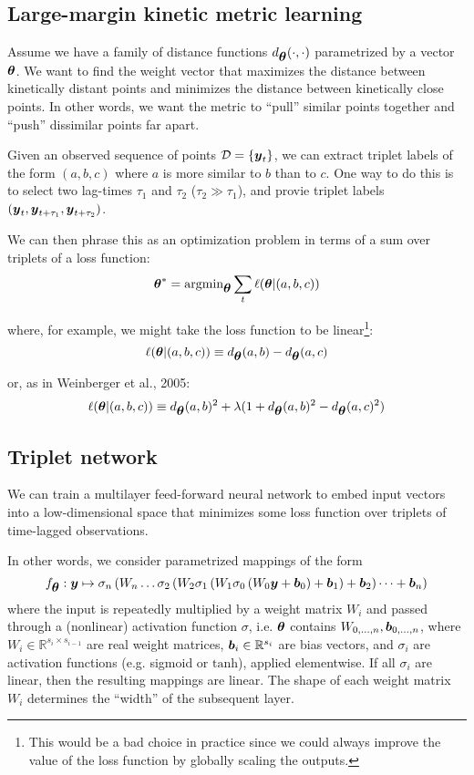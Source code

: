 \documentclass[aps,prl,preprint,nofootinbib,superscriptaddress,linenumbers]{revtex4-1}
\newcommand{\bfv}[1]{{\mbox{\boldmath{$#1$}}}}
\newcommand{\y}{\bfv{y}}
\newcommand{\params}{\bfv{\theta}}
\begin{document}
\subsection{Large-margin kinetic metric learning}
Assume we have a family of distance functions $d_\params(\cdot, \cdot)$ parametrized by a vector $\params$. We want to find the weight vector that maximizes the distance between kinetically distant points and minimizes the distance between kinetically close points. In other words, we want the metric to ``pull'' similar points together and ``push'' dissimilar points far apart.

Given an observed sequence of points $\mathcal{D} = \{\y_t\}$, we can extract triplet labels of the form $(a,b,c)$ where $a$ is more similar to $b$ than to $c$. One way to do this is to select two lag-times $\tau_1$ and $\tau_2$ ($\tau_2 \gg \tau_1$), and provie triplet labels $(\y_t,\y_{t+\tau_1},\y_{t+\tau_2})$.

We can then phrase this as an optimization problem in terms of a sum over triplets of a loss function:
\begin{equation} \label{eq:triplet_loss}
\params^* = \text{argmin}_\params \sum_{t} \ell(\params | (a,b,c))
\end{equation}

where, for example, we might take the loss function to be linear\footnote{This would be a bad choice in practice since we could always improve the value of the loss function by globally scaling the outputs.}:
$$
\ell(\params | (a,b,c)) \equiv d_\params(a,b)-d_\params(a,c)
$$

or, as in Weinberger et al., 2005:
$$\ell(\params | (a,b,c)) \equiv d_\params(a,b)^2 + \lambda (1 + d_\params(a,b)^2 - d_\params(a,c)^2)$$


\subsection{Triplet network}
We can train a multilayer feed-forward neural network to embed input vectors into a low-dimensional space that minimizes some loss function over triplets of time-lagged observations.

In other words, we consider parametrized mappings of the form
$$f_\params
:\y\mapsto
\sigma_n \left( W_n \dots \sigma_2 \left( W_2 \sigma_1 \left( W_1 \sigma_0 \left( W_0 \y  + \bfv{b}_0 \right)  + \bfv{b}_1 \right)  + \bfv{b}_2 \right) \dots + \bfv{b}_n \right)$$
where the input is repeatedly multiplied by a weight matrix $W_i$ and passed through a (nonlinear) activation function $\sigma$, i.e. $\params$ contains ${W_{0, \dots, n},\bfv{b}_{0,\dots, n}}$, where $W_i \in \mathbb{R}^{s_{i}\times s_{i-1}}$ are real weight matrices, $\bfv{b}_i \in \mathbb{R}^{s_i}$ are bias vectors, and $\sigma_i$ are activation functions (e.g. sigmoid or $\text{tanh}$), applied elementwise. If all $\sigma_i$ are linear, then the resulting mappings are linear. The shape of each weight matrix $W_i$ determines the ``width'' of the subsequent layer.
\end{document}
